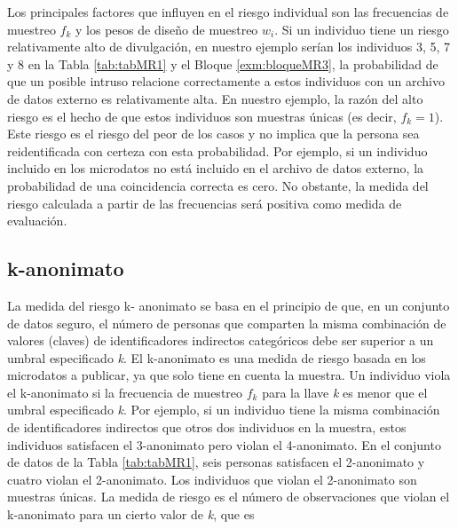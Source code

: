 \documentclass[
]{book}
\newenvironment{Shaded}{\begin{snugshade}}{\end{snugshade}}
\newcommand{\NormalTok}[1]{#1}
\newcommand{\SpecialCharTok}[1]{\textcolor[rgb]{0.00,0.00,0.00}{#1}}
\theoremstyle{definition}
\theoremstyle{definition}
\theoremstyle{definition}
\theoremstyle{definition}
\theoremstyle{remark}
\begin{document}
\begin{Shaded}
\end{Shaded}

Los principales factores que influyen en el riesgo individual son las frecuencias de muestreo \(f_{k}\) y los pesos de diseño de muestreo \(w_{i}\). Si un individuo tiene un riesgo relativamente alto de divulgación, en nuestro ejemplo serían los individuos 3, 5, 7 y 8 en la Tabla \ref{tab:tabMR1} y el Bloque \ref{exm:bloqueMR3}, la probabilidad de que un posible intruso relacione correctamente a estos individuos con un archivo de datos externo es relativamente alta. En nuestro ejemplo, la razón del alto riesgo es el hecho de que estos individuos son muestras únicas (es decir, \(f_{k}=1\)). Este riesgo es el riesgo del peor de los casos y no implica que la persona sea reidentificada con certeza con esta probabilidad. Por ejemplo, si un individuo incluido en los microdatos no está incluido en el archivo de datos externo, la probabilidad de una coincidencia correcta es cero. No obstante, la medida del riesgo calculada a partir de las frecuencias será positiva como medida de evaluación.

\hypertarget{k-anonimato}{%
\subsection{k-anonimato}\label{k-anonimato}}

La medida del riesgo k- anonimato se basa en el principio de que, en un conjunto de datos seguro, el número de personas que comparten la misma combinación de valores (claves) de identificadores indirectos categóricos debe ser superior a un umbral especificado \emph{k}. El k-anonimato es una medida de riesgo basada en los microdatos a publicar, ya que solo tiene en cuenta la muestra. Un individuo viola el k-anonimato si la frecuencia de muestreo \(f_{k}\) para la llave \emph{k} es menor que el umbral especificado \emph{k}. Por ejemplo, si un individuo tiene la misma combinación de identificadores indirectos que otros dos individuos en la muestra, estos individuos satisfacen el 3-anonimato pero violan el 4-anonimato. En el conjunto de datos de la Tabla \ref{tab:tabMR1}, seis personas satisfacen el 2-anonimato y cuatro violan el 2-anonimato. Los individuos que violan el 2-anonimato son muestras únicas. La medida de riesgo es el número de observaciones que violan el k-anonimato para un cierto valor de \emph{k}, que es
\end{document}
